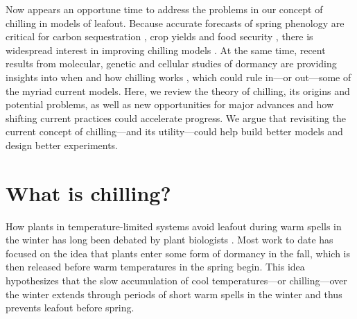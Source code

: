 \documentclass[11pt]{article}
\newcommand{\R}[1]{\label{#1}\linelabel{#1}}
\begin{document}
Now appears an opportune time to address the problems in our concept of chilling in models of leafout. Because accurate forecasts of spring phenology are critical for carbon sequestration \citep{green2022limits,keenan2014net}, \R{r2foodsafety}crop yields and food security \citep{lee2024regulation,leisner2020climate}, there is widespread interest in improving chilling models \citep{Luedeling2015Acta,chuine2016}. At the same time, recent results from molecular, genetic and cellular studies of dormancy are providing insights into when and how chilling works \citep{pan2023epigenetic,zhu2021cold}, which could rule in---or out---some of the myriad current models. %
Here, we review the theory of chilling, its origins and potential problems, as well as new opportunities for major advances and how shifting current practices could accelerate progress. We argue that revisiting the current concept of chilling---and its utility---could help build better models and design better experiments. %

\section*{What is chilling?}
How plants in temperature-limited systems avoid leafout during warm spells in the winter has long been debated by plant biologists \citep[e.g.,][]{lamb1948effect,weinberger}. Most work to date has focused on the idea that plants enter some form of dormancy in the fall, which is then released before warm temperatures in the spring begin. This idea hypothesizes that the slow accumulation of cool temperatures---or chilling---over the winter extends through periods of short warm spells in the winter and thus prevents leafout before spring. 
\end{document}
